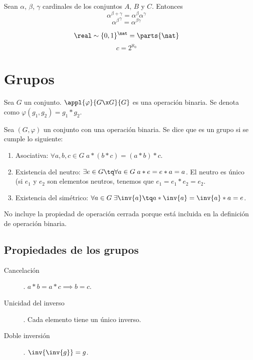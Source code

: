 \documentclass[nochap]{apuntes}
\begin{document}
\begin{corol}
Sean $\alpha$, $\beta$, $\gamma$ cardinales de los conjuntos $A$, $B$ y $C$. Entonces \[ \alpha^{\beta+\gamma}=\alpha^\beta\alpha^\gamma\] \[ {\alpha^\beta}^\gamma=\alpha^{\beta\gamma}\]
\end{corol}

\begin{theorem}
\[ \real \sim \{0,1\}^\nat=\parts{\nat} \]
\[ c = 2^{\aleph_0} \]
\end{theorem}

\section{Grupos}
\begin{defn}
Sea $G$ un conjunto. $\appl{\varphi}{G\x G}{G}$ es una operación binaria. Se denota como $\varphi (g_1, g_2)=g_1\ast g_2$.
\end{defn}

\begin{defn}[Grupos]
Sea $(G, \varphi)$ un conjunto con una operación binaria. Se dice que es un grupo si se cumple lo siguiente:
\begin{enumerate}
\item Asociativa: $\forall a,b,c \in G \; a\ast (b\ast c) = (a \ast b) \ast c$.
\item Existencia del neutro: $\exists e \in G \tq \forall a \in G \; a \ast e = e \ast a = a$. El neutro es único (si $e_1$ y $e_2$ son elementos neutros, tenemos que $e_1=e_1 \ast e_2 =e_2$.
\item Existencia del simétrico: $\forall a \in G \; \exists \inv{a} \tq a \ast \inv{a} =\inv{a}\ast a = e$.
\end{enumerate}
\end{defn}

\begin{remark} No incluye la propiedad de operación cerrada porque está incluida en la definición de operación binaria.\end{remark}

\subsection{Propiedades de los grupos}

\begin{description}
\item[Cancelación]. $a\ast b = a \ast c \implies b=c$.
\item[Unicidad del inverso]. Cada elemento tiene un único inverso.
\item[Doble inversión]. $\inv{\inv{g}}=g$.
\end{description}
\end{document}

